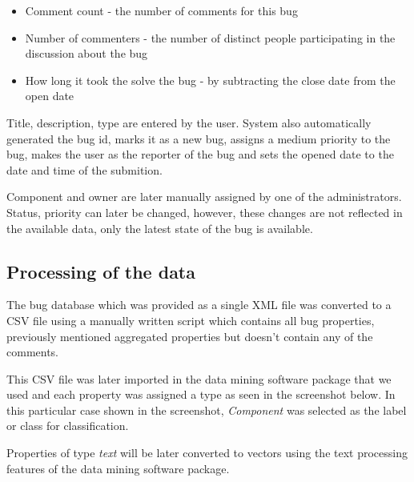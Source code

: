 \begin{itemize}
\item Comment count - the number of comments for this bug
\item Number of commenters - the number of distinct people participating in the discussion about the bug
\item How long it took the solve the bug - by subtracting the close date from the open date
\end{itemize}

Title, description, type are entered by the user. System also automatically generated the bug id, marks it as a new bug, assigns a medium priority to the bug, makes the user as the reporter of the bug and sets the opened date to the date and time of the submition.

Component and owner are later manually assigned by one of the administrators. Status, priority can later be changed, however, these changes are not reflected in the available data, only the latest state of the bug is available.

\subsection*{Processing of the data} %

The bug database which was provided as a single XML file was converted to a CSV file using a manually written script which contains all bug properties, previously mentioned aggregated properties but doesn't contain any of the comments.

This CSV file was later imported in the data mining software package that we used and each property was assigned a type as seen in the screenshot below. In this particular case shown in the screenshot, {\it Component} was selected as the label or class for classification.


Properties of type {\it text} will be later converted to vectors using the text processing features of the data mining software package.
